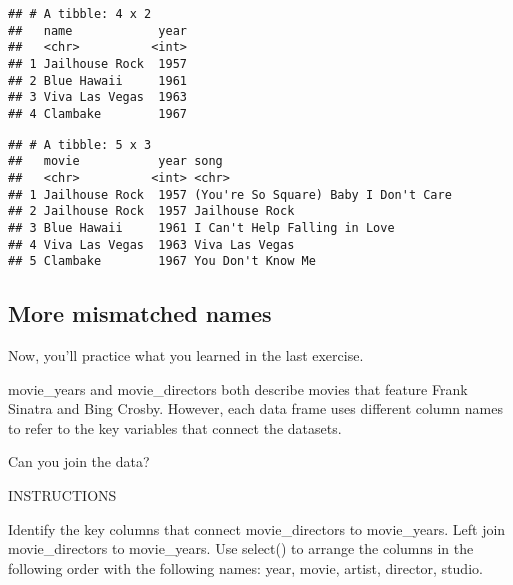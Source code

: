 \documentclass[]{article}
\newenvironment{Shaded}{\begin{snugshade}}{\end{snugshade}}
\newcommand{\KeywordTok}[1]{\textcolor[rgb]{0.13,0.29,0.53}{\textbf{#1}}}
\newcommand{\DataTypeTok}[1]{\textcolor[rgb]{0.13,0.29,0.53}{#1}}
\newcommand{\StringTok}[1]{\textcolor[rgb]{0.31,0.60,0.02}{#1}}
\newcommand{\CommentTok}[1]{\textcolor[rgb]{0.56,0.35,0.01}{\textit{#1}}}
\newcommand{\OperatorTok}[1]{\textcolor[rgb]{0.81,0.36,0.00}{\textbf{#1}}}
\newcommand{\NormalTok}[1]{#1}
\begin{document}
\begin{verbatim}
## # A tibble: 4 x 2
##   name            year
##   <chr>          <int>
## 1 Jailhouse Rock  1957
## 2 Blue Hawaii     1961
## 3 Viva Las Vegas  1963
## 4 Clambake        1967
\end{verbatim}

\begin{Shaded}
\end{Shaded}

\begin{verbatim}
## # A tibble: 5 x 3
##   movie           year song                                
##   <chr>          <int> <chr>                               
## 1 Jailhouse Rock  1957 (You're So Square) Baby I Don't Care
## 2 Jailhouse Rock  1957 Jailhouse Rock                      
## 3 Blue Hawaii     1961 I Can't Help Falling in Love        
## 4 Viva Las Vegas  1963 Viva Las Vegas                      
## 5 Clambake        1967 You Don't Know Me
\end{verbatim}

\subsection{More mismatched names}\label{more-mismatched-names}

Now, you'll practice what you learned in the last exercise.

movie\_years and movie\_directors both describe movies that feature
Frank Sinatra and Bing Crosby. However, each data frame uses different
column names to refer to the key variables that connect the datasets.

Can you join the data?

INSTRUCTIONS

Identify the key columns that connect movie\_directors to movie\_years.
Left join movie\_directors to movie\_years. Use select() to arrange the
columns in the following order with the following names: year, movie,
artist, director, studio.
\end{document}
